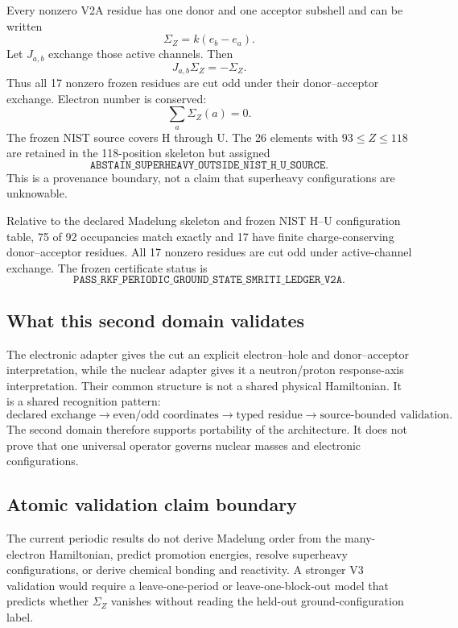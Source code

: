 Every nonzero V2A residue has one donor and one acceptor subshell and can be written
\[
 \Sigma_Z=k(e_b-e_a).
\]
Let $J_{a,b}$ exchange those active channels. Then
\[
 J_{a,b}\Sigma_Z=-\Sigma_Z.
\]
Thus all 17 nonzero frozen residues are cut odd under their donor--acceptor exchange. Electron number is conserved:
\[
 \sum_a\Sigma_Z(a)=0.
\]
The frozen NIST source covers H through U. The 26 elements with $93\le Z\le118$ are retained in the 118-position skeleton but assigned
\[
 \texttt{ABSTAIN\_SUPERHEAVY\_OUTSIDE\_NIST\_H\_U\_SOURCE}.
\]
This is a provenance boundary, not a claim that superheavy configurations are unknowable.

\begin{proposition}
Relative to the declared Madelung skeleton and frozen NIST H--U configuration table, 75 of 92 occupancies match exactly and 17 have finite charge-conserving donor--acceptor residues. All 17 nonzero residues are cut odd under active-channel exchange. The frozen certificate status is
\[
 \texttt{PASS\_RKF\_PERIODIC\_GROUND\_STATE\_SMRITI\_LEDGER\_V2A}.
\]
\end{proposition}

\subsection{What this second domain validates}

The electronic adapter gives the cut an explicit electron--hole and donor--acceptor interpretation, while the nuclear adapter gives it a neutron/proton response-axis interpretation. Their common structure is not a shared physical Hamiltonian. It is a shared recognition pattern:
\[
\text{declared exchange}\to\text{even/odd coordinates}\to
\text{typed residue}\to\text{source-bounded validation}.
\]
The second domain therefore supports portability of the architecture. It does not prove that one universal operator governs nuclear masses and electronic configurations.

\subsection{Atomic validation claim boundary}

The current periodic results do not derive Madelung order from the many-electron Hamiltonian, predict promotion energies, resolve superheavy configurations, or derive chemical bonding and reactivity. A stronger V3 validation would require a leave-one-period or leave-one-block-out model that predicts whether $\Sigma_Z$ vanishes without reading the held-out ground-configuration label.
